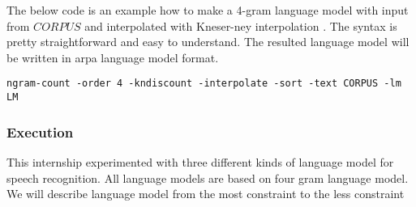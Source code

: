The below code is an example how to make a 4-gram language model with input from $CORPUS$ and interpolated with Kneser-ney interpolation \cite{KneserNey1993}. The syntax is pretty straightforward and easy to understand. The resulted language model will be written in arpa language model format.
\begin{verbatim}
ngram-count -order 4 -kndiscount -interpolate -sort -text CORPUS -lm LM
\end{verbatim}

\subsubsection{Execution}
This internship experimented with three different kinds of language model for speech recognition. All language models are based on four gram language model. We will describe language model from the most constraint to the less constraint

